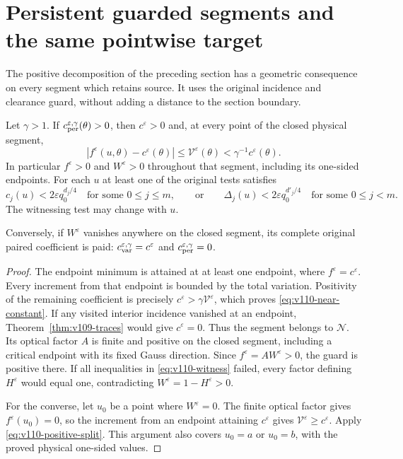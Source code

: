 \section{Persistent guarded segments and the same pointwise target}
\label{sec:v110-persistence}
The positive decomposition of the preceding section has a geometric
consequence on every segment which retains source. It uses the
original incidence and clearance guard, without adding a distance
to the section boundary.

\begin{theorem}
\label{thm:v110-persistence}
Let $\gamma>1$. If $c_{\rm per}^{\varepsilon,\gamma}(\theta)>0$,
then $c^\varepsilon>0$ and, at every point of the closed physical
segment,
\begin{equation}\label{eq:v110-near-constant}
 |f^\varepsilon(u,\theta)-c^\varepsilon(\theta)|
       \le\mathcal V^\varepsilon(\theta)
       <\gamma^{-1}c^\varepsilon(\theta).
\end{equation}
In particular $f^\varepsilon>0$ and $W^\varepsilon>0$ throughout
that segment, including its one-sided endpoints. For each $u$ at
least one of the original tests satisfies
\begin{equation}\label{eq:v110-witness}
 c_j(u)<2\varepsilon q_0^{d_j/4}
       \quad\text{for some }0\le j\le m,
 \qquad\text{or}\qquad
 \Delta_j(u)<2\varepsilon q_0^{d'_j/4}
       \quad\text{for some }0\le j<m.
\end{equation}
The witnessing test may change with $u$.

Conversely, if $W^\varepsilon$ vanishes anywhere on the closed
segment, its complete original paired coefficient is paid:
$c_{\rm var}^{\varepsilon,\gamma}=c^\varepsilon$ and
$c_{\rm per}^{\varepsilon,\gamma}=0$.
\end{theorem}
\begin{proof}
The endpoint minimum is attained at at least one endpoint, where
$f^\varepsilon=c^\varepsilon$. Every increment from that endpoint
is bounded by the total variation. Positivity of the remaining
coefficient is precisely $c^\varepsilon>\gamma\mathcal V^\varepsilon$,
which proves \eqref{eq:v110-near-constant}. If any visited interior
incidence vanished at an endpoint, Theorem~\ref{thm:v109-traces}
would give $c^\varepsilon=0$. Thus the segment belongs to
$\mathcal N$. Its optical factor $A$ is finite and positive on the
closed segment, including a critical endpoint with its fixed
Gauss direction. Since $f^\varepsilon=AW^\varepsilon>0$, the guard
is positive there. If all inequalities in \eqref{eq:v110-witness}
failed, every factor defining $H^\varepsilon$ would equal one,
contradicting $W^\varepsilon=1-H^\varepsilon>0$.

For the converse, let $u_0$ be a point where $W^\varepsilon=0$.
The finite optical factor gives $f^\varepsilon(u_0)=0$, so the
increment from an endpoint attaining $c^\varepsilon$ gives
$\mathcal V^\varepsilon\ge c^\varepsilon$. Apply
\eqref{eq:v110-positive-split}. This argument also covers $u_0=a$
or $u_0=b$, with the proved physical one-sided values.
\end{proof}

